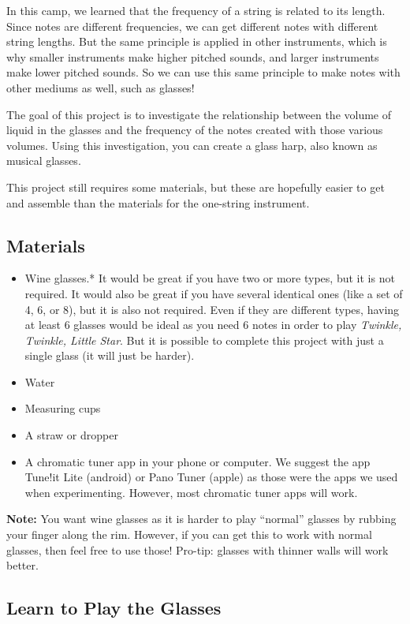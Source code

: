 \documentclass[12pt,noauthor,nooutcomes,hints,instructornotes]{ximera}%
\begin{document}
In this camp, we learned that the frequency of a string is related to its length.  Since notes are different frequencies, we can get different notes with different string lengths.  But the same principle is applied in other instruments, which is why smaller instruments make higher pitched sounds, and larger instruments make lower pitched sounds.  So we can use this same principle to make notes with other mediums as well, such as glasses!

The goal of this project is to investigate the relationship between the volume of liquid in the glasses and the frequency of the notes created with those various volumes.  Using this investigation, you can create a glass harp, also known as musical glasses. 

This project still requires some materials, but these are hopefully easier to get and assemble than the materials for the one-string instrument.

\subsection{Materials}
\begin{itemize}
    \item Wine glasses.* It would be great if you have two or more types, but it is not required.  It would also be great if you have several identical ones (like a set of 4, 6, or 8), but it is also not required.  Even if they are different types, having at least 6 glasses would be ideal as you need 6 notes in order to play \textit{Twinkle, Twinkle, Little Star}.  But it is possible to complete this project with just a single glass (it will just be harder).
    \item Water
    \item Measuring cups
    \item A straw or dropper
    \item A chromatic tuner app in your phone or computer.  We suggest the app Tune!it Lite (android) or Pano Tuner (apple) as those were the apps we used when experimenting.  However, most chromatic tuner apps will work.
\end{itemize}

\textbf{Note:} You want wine glasses as it is harder to play ``normal'' glasses by rubbing your finger along the rim.  However, if you can get this to work with normal glasses, then feel free to use those! Pro-tip: glasses with thinner walls will work better.

\subsection{Learn to Play the Glasses}
\end{document}

